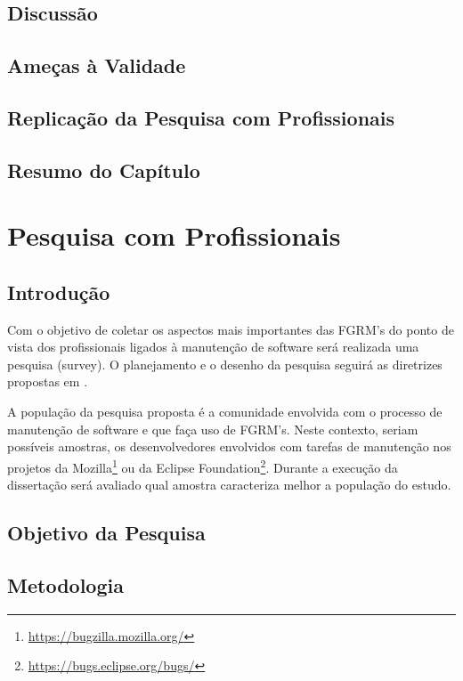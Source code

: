 \documentclass[msc]{ppgccufmg} %
\begin{document}
\section{Discussão}

\section{Ameças à Validade}

\section{Replicação da Pesquisa com Profissionais}

\section{Resumo do Capítulo}


\chapter{Pesquisa com Profissionais}
\label{ch:pesquisa-profissionais}

\section{Introdução}
Com o objetivo de coletar os aspectos mais importantes das FGRM's do ponto de
vista dos profissionais ligados à manutenção de software será realizada uma
 pesquisa (survey). O planejamento e o desenho da pesquisa seguirá as diretrizes propostas em \cite{wohlin2012experimentation}.

A população da pesquisa proposta é a comunidade envolvida com o processo de
manutenção de software e que faça uso de FGRM's. Neste contexto, seriam
possíveis amostras, os desenvolvedores envolvidos com tarefas de manutenção nos
projetos da Mozilla\footnote{\url{https://bugzilla.mozilla.org/}} ou da
Eclipse Foundation\footnote{\url{https://bugs.eclipse.org/bugs/}}. Durante a
execução da dissertação será avaliado qual amostra caracteriza melhor a
população do estudo.

\section{Objetivo da Pesquisa}

\section{Metodologia}
\end{document}
